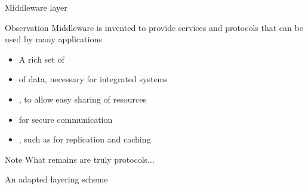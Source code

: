 \begin{slide}{Middleware layer}
  \begin{block}{Observation} 
    Middleware is invented to provide  services and protocols that can be used by many
     applications
    \begin{itemize}\tightlist
    \item A rich set of 
    \item {} of data, necessary for integrated systems
    \item {}, to allow easy sharing of resources
    \item {} for secure communication
    \item {}, such as for replication and caching
    \end{itemize}
  \end{block}
  \begin{alertblock}{Note} 
    What remains are truly  protocols... 
  \end{alertblock}
\end{slide}
\begin{slide}{An adapted layering scheme}
  \begin{block}{}
    \begin{center}
    \end{center}
  \end{block}
\end{slide}
